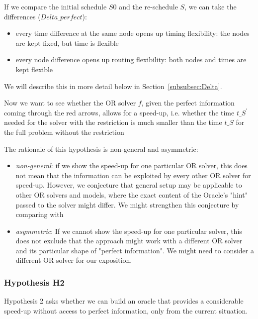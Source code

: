 \documentclass{article}
\begin{document}
If we compare the initial schedule $S0$ and the re-schedule $S$, we can take the differences ($Delta\_perfect$):

\begin{itemize}
    \item     every time difference at the same node opens up timing flexibility: the nodes are kept fixed, but time is flexible
    \item every node difference opens up routing flexibility: both nodes and times are kept flexible
\end{itemize}
We will describe this in more detail below in Section~\ref{subsubsec:Delta}.


Now we want to see whether the OR solver $f$, given the perfect information coming through the red arrows, allows for a speed-up, i.e. whether the time $t\_{S^\prime}$  needed for the solver with the restriction is much smaller than the time $t\_S$ for the full problem without the restriction

The rationale of this hypothesis is non-general and asymmetric:
%
\begin{itemize}
    \item
    \emph{non-general}: if we show the speed-up for one particular OR solver, this does not mean that the information can be exploited by every other OR solver for speed-up. However, we conjecture that general setup may be applicable to other OR solvers and models, where the exact content of the Oracle's "hint" passed to the solver might differ. We might strengthen this conjecture by comparing with
\item
    \emph{asymmetric}: If we cannot show the speed-up for one particular solver, this does not exclude that the approach might work with a different OR solver and its particular shape of "perfect information". We might need to consider a different OR solver for our exposition.
\end{itemize}



\subsubsection{Hypothesis H2}\label{subec:H2}
Hypothesis 2 asks whether we can build an oracle that provides a considerable speed-up without access to perfect information, only from the current situation.
\end{document}
